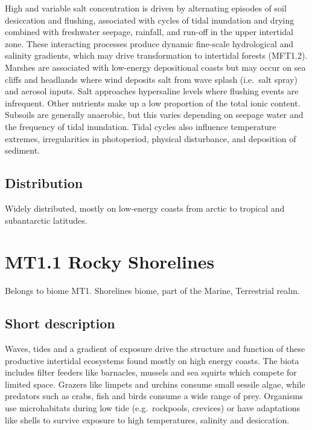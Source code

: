 \documentclass[
  letterpaper,
  DIV=11,
  numbers=noendperiod]{scrartcl}
\begin{document}
High and variable salt concentration is driven by alternating episodes
of soil desiccation and flushing, associated with cycles of tidal
inundation and drying combined with freshwater seepage, rainfall, and
run-off in the upper intertidal zone. These interacting processes
produce dynamic fine-scale hydrological and salinity gradients, which
may drive transformation to intertidal forests (MFT1.2). Marshes are
associated with low-energy depositional coasts but may occur on sea
cliffs and headlands where wind deposits salt from wave splash
(i.e.~salt spray) and aerosol inputs. Salt approaches hypersaline levels
where flushing events are infrequent. Other nutrients make up a low
proportion of the total ionic content. Subsoils are generally anaerobic,
but this varies depending on seepage water and the frequency of tidal
inundation. Tidal cycles also influence temperature extremes,
irregularities in photoperiod, physical disturbance, and deposition of
sediment.

\subsection{Distribution}\label{distribution-51}

Widely distributed, mostly on low-energy coasts from arctic to tropical
and subantarctic latitudes.

\section{MT1.1 Rocky Shorelines}\label{mt1.1-rocky-shorelines}

Belongs to biome MT1. Shorelines biome, part of the Marine, Terrestrial
realm.

\subsection{Short description}\label{short-description-52}

Waves, tides and a gradient of exposure drive the structure and function
of these productive intertidal ecosystems found mostly on high energy
coasts. The biota includes filter feeders like barnacles, mussels and
sea squirts which compete for limited space. Grazers like limpets and
urchins consume small sessile algae, while predators such as crabs, fish
and birds consume a wide range of prey. Organisms use microhabitats
during low tide (e.g.~rockpools, crevices) or have adaptations like
shells to survive exposure to high temperatures, salinity and
desiccation.
\end{document}
